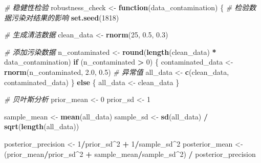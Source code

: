 \documentclass[
  twoside]{book}
\newenvironment{Shaded}{\begin{snugshade}}{\end{snugshade}}
\newcommand{\CommentTok}[1]{\textcolor[rgb]{0.56,0.35,0.01}{\textit{#1}}}
\newcommand{\ControlFlowTok}[1]{\textcolor[rgb]{0.13,0.29,0.53}{\textbf{#1}}}
\newcommand{\DecValTok}[1]{\textcolor[rgb]{0.00,0.00,0.81}{#1}}
\newcommand{\FloatTok}[1]{\textcolor[rgb]{0.00,0.00,0.81}{#1}}
\newcommand{\FunctionTok}[1]{\textcolor[rgb]{0.13,0.29,0.53}{\textbf{#1}}}
\newcommand{\NormalTok}[1]{#1}
\newcommand{\OtherTok}[1]{\textcolor[rgb]{0.56,0.35,0.01}{#1}}
\newcommand{\SpecialCharTok}[1]{\textcolor[rgb]{0.81,0.36,0.00}{\textbf{#1}}}
\begin{document}
\begin{Shaded}
\begin{Highlighting}[]
\CommentTok{\# 稳健性检验}
\NormalTok{robustness\_check }\OtherTok{\textless{}{-}} \ControlFlowTok{function}\NormalTok{(data\_contamination) \{}
  \CommentTok{\# 检验数据污染对结果的影响}
  \FunctionTok{set.seed}\NormalTok{(}\DecValTok{1818}\NormalTok{)}

  \CommentTok{\# 生成清洁数据}
\NormalTok{  clean\_data }\OtherTok{\textless{}{-}} \FunctionTok{rnorm}\NormalTok{(}\DecValTok{25}\NormalTok{, }\FloatTok{0.5}\NormalTok{, }\FloatTok{0.3}\NormalTok{)}

  \CommentTok{\# 添加污染数据}
\NormalTok{  n\_contaminated }\OtherTok{\textless{}{-}} \FunctionTok{round}\NormalTok{(}\FunctionTok{length}\NormalTok{(clean\_data) }\SpecialCharTok{*}\NormalTok{ data\_contamination)}
  \ControlFlowTok{if}\NormalTok{ (n\_contaminated }\SpecialCharTok{\textgreater{}} \DecValTok{0}\NormalTok{) \{}
\NormalTok{    contaminated\_data }\OtherTok{\textless{}{-}} \FunctionTok{rnorm}\NormalTok{(n\_contaminated, }\FloatTok{2.0}\NormalTok{, }\FloatTok{0.5}\NormalTok{)  }\CommentTok{\# 异常值}
\NormalTok{    all\_data }\OtherTok{\textless{}{-}} \FunctionTok{c}\NormalTok{(clean\_data, contaminated\_data)}
\NormalTok{  \} }\ControlFlowTok{else}\NormalTok{ \{}
\NormalTok{    all\_data }\OtherTok{\textless{}{-}}\NormalTok{ clean\_data}
\NormalTok{  \}}

  \CommentTok{\# 贝叶斯分析}
\NormalTok{  prior\_mean }\OtherTok{\textless{}{-}} \DecValTok{0}
\NormalTok{  prior\_sd }\OtherTok{\textless{}{-}} \DecValTok{1}

\NormalTok{  sample\_mean }\OtherTok{\textless{}{-}} \FunctionTok{mean}\NormalTok{(all\_data)}
\NormalTok{  sample\_sd }\OtherTok{\textless{}{-}} \FunctionTok{sd}\NormalTok{(all\_data) }\SpecialCharTok{/} \FunctionTok{sqrt}\NormalTok{(}\FunctionTok{length}\NormalTok{(all\_data))}

\NormalTok{  posterior\_precision }\OtherTok{\textless{}{-}} \DecValTok{1}\SpecialCharTok{/}\NormalTok{prior\_sd}\SpecialCharTok{\^{}}\DecValTok{2} \SpecialCharTok{+} \DecValTok{1}\SpecialCharTok{/}\NormalTok{sample\_sd}\SpecialCharTok{\^{}}\DecValTok{2}
\NormalTok{  posterior\_mean }\OtherTok{\textless{}{-}}\NormalTok{ (prior\_mean}\SpecialCharTok{/}\NormalTok{prior\_sd}\SpecialCharTok{\^{}}\DecValTok{2} \SpecialCharTok{+}\NormalTok{ sample\_mean}\SpecialCharTok{/}\NormalTok{sample\_sd}\SpecialCharTok{\^{}}\DecValTok{2}\NormalTok{) }\SpecialCharTok{/}\NormalTok{ posterior\_precision}


\end{Highlighting}
\end{Shaded}
\end{document}
